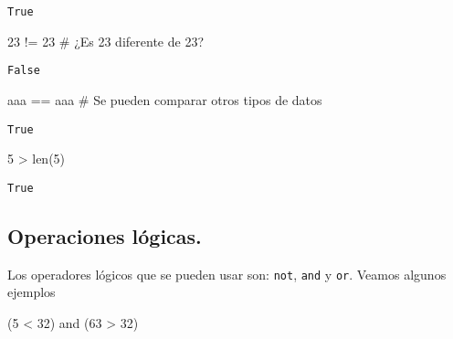 \documentclass[
  letterpaper,
  DIV=11,
  numbers=noendperiod]{scrreprt}
\newenvironment{Shaded}{\begin{snugshade}}{\end{snugshade}}
\newcommand{\BuiltInTok}[1]{\textcolor[rgb]{0.00,0.23,0.31}{#1}}
\newcommand{\CommentTok}[1]{\textcolor[rgb]{0.37,0.37,0.37}{#1}}
\newcommand{\DecValTok}[1]{\textcolor[rgb]{0.68,0.00,0.00}{#1}}
\newcommand{\KeywordTok}[1]{\textcolor[rgb]{0.00,0.23,0.31}{#1}}
\newcommand{\NormalTok}[1]{\textcolor[rgb]{0.00,0.23,0.31}{#1}}
\newcommand{\OperatorTok}[1]{\textcolor[rgb]{0.37,0.37,0.37}{#1}}
\newcommand{\StringTok}[1]{\textcolor[rgb]{0.13,0.47,0.30}{#1}}
\begin{document}
\begin{verbatim}
True
\end{verbatim}

\begin{Shaded}
\begin{Highlighting}[]
\DecValTok{23} \OperatorTok{!=} \DecValTok{23} \CommentTok{\# ¿Es 23 diferente de 23?}
\end{Highlighting}
\end{Shaded}

\begin{verbatim}
False
\end{verbatim}

\begin{Shaded}
\begin{Highlighting}[]
\CommentTok{\textquotesingle{}aaa\textquotesingle{}} \OperatorTok{==} \StringTok{\textquotesingle{}aaa\textquotesingle{}} \CommentTok{\# Se pueden comparar otros tipos de datos}
\end{Highlighting}
\end{Shaded}

\begin{verbatim}
True
\end{verbatim}

\begin{Shaded}
\begin{Highlighting}[]
\DecValTok{5} \OperatorTok{\textgreater{}} \BuiltInTok{len}\NormalTok{(}\StringTok{\textquotesingle{}5\textquotesingle{}}\NormalTok{)}
\end{Highlighting}
\end{Shaded}

\begin{verbatim}
True
\end{verbatim}

\subsection{Operaciones lógicas.}\label{operaciones-luxf3gicas.}

Los operadores lógicos que se pueden usar son: \texttt{not},
\texttt{and} y \texttt{or}. Veamos algunos ejemplos

\begin{Shaded}
\begin{Highlighting}[]
\NormalTok{(}\DecValTok{5} \OperatorTok{\textless{}} \DecValTok{32}\NormalTok{) }\KeywordTok{and}\NormalTok{ (}\DecValTok{63} \OperatorTok{\textgreater{}} \DecValTok{32}\NormalTok{) }
\end{Highlighting}
\end{Shaded}
\end{document}
